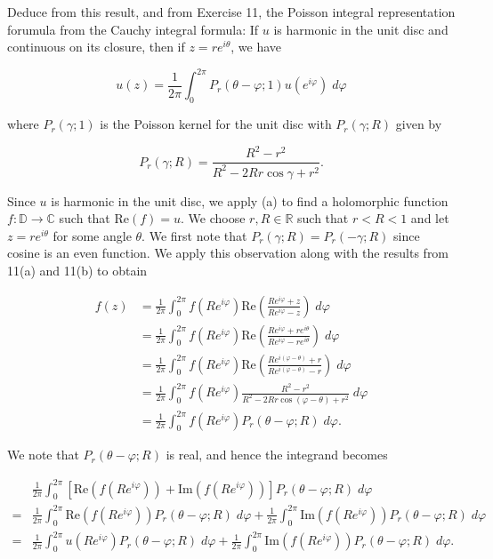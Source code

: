 Deduce from this result, and from Exercise 11, the Poisson integral representation forumula from the Cauchy integral 
formula: If $u$ is harmonic in the unit disc and continuous on its closure, then if $z = re^{i \theta}$, we have

$$
u(z) = \frac{1}{2 \pi} \int_{0}^{2 \pi} P_r (\theta - \varphi; 1) u(e^{i \varphi}) \; d\varphi
$$

where $P_r(\gamma; 1)$ is the Poisson kernel for the unit disc with $P_r(\gamma; R)$ given by

$$
P_r(\gamma; R) = \frac{R^2 - r^2}{R^2 - 2 R r \cos \gamma + r^2}.
$$

\begin{solution}
    Since $u$ is harmonic in the unit disc, we apply (a) to find a holomorphic function $f:\mathbb{D} \to \mathbb{C}$
    such that $\text{Re}(f) = u$. We choose $r, R \in \mathbb{R}$ such that $r < R < 1$ and let $z = r e^{i \theta}$ for
    some angle $\theta$. We first note that $P_r(\gamma; R) = P_r(-\gamma; R)$ since cosine is an even function. We apply this
    observation along with the results from 11(a) and 11(b) to obtain

    \begin{align*}
    f(z) &= \frac{1}{2 \pi} \int_0^{2 \pi} f(R e^{i \varphi}) \text{Re} \left( \frac{R e^{i \varphi} + z}{R e^{i \varphi} - z} \right) \; d\varphi \\
         &= \frac{1}{2 \pi} \int_0^{2 \pi} f(R e^{i \varphi}) \text{Re} \left( \frac{R e^{i \varphi} + r e^{i \theta}}{R e^{i \varphi} - r e^{i \theta}} \right) \; d\varphi \\
         &= \frac{1}{2 \pi} \int_0^{2 \pi} f(R e^{i \varphi}) \text{Re} \left( \frac{R e^{i (\varphi - \theta)} + r}{R e^{i (\varphi - \theta)} - r} \right) \; d\varphi \\
         &= \frac{1}{2 \pi} \int_0^{2 \pi} f(R e^{i \varphi}) \frac{R^2 - r^2}{R^2 - 2 R r \cos(\varphi - \theta) + r^2} \; d\varphi \\
         &= \frac{1}{2 \pi} \int_0^{2 \pi} f(R e^{i \varphi}) P_r(\theta - \varphi; R) \; d\varphi.
    \end{align*}

    We note that $P_r(\theta - \varphi; R)$ is real, and hence the integrand becomes

    \begin{align*}
     &\frac{1}{2 \pi} \int_0^{2 \pi} \left[ \text{Re}\left(f(R e^{i \varphi})\right) + \text{Im}\left(f(R e^{i \varphi})\right) \right] P_r(\theta - \varphi; R) \; d\varphi \\
    = &\frac{1}{2 \pi} \int_0^{2 \pi} \text{Re}\left(f(R e^{i \varphi})\right) P_r(\theta - \varphi; R) \; d\varphi + \frac{1}{2 \pi} \int_0^{2 \pi} \text{Im}\left(f(R e^{i \varphi})\right) P_r(\theta - \varphi; R) \; d\varphi \\
    = &\frac{1}{2 \pi} \int_0^{2 \pi} u(R e^{i \varphi}) P_r(\theta - \varphi; R) \; d\varphi + \frac{1}{2 \pi} \int_0^{2 \pi} \text{Im}\left(f(R e^{i \varphi})\right) P_r(\theta - \varphi; R) \; d\varphi.
    \end{align*}


\end{solution}
